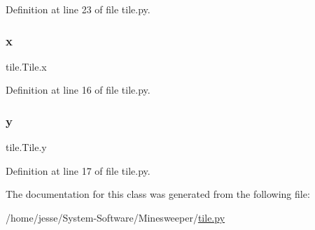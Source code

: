 Definition at line 23 of file tile.\+py.

\mbox{\label{classtile_1_1_tile_a3d5f111dcaf01ba902df52f85ee50318}} 
\subsubsection{\texorpdfstring{x}{x}}
{\footnotesize\ttfamily tile.\+Tile.\+x}



Definition at line 16 of file tile.\+py.

\mbox{\label{classtile_1_1_tile_aea02ac6a7bbed9aacf20d5db108f3006}} 
\subsubsection{\texorpdfstring{y}{y}}
{\footnotesize\ttfamily tile.\+Tile.\+y}



Definition at line 17 of file tile.\+py.



The documentation for this class was generated from the following file\+:\begin{DoxyCompactItemize}
\item 
/home/jesse/\+System-\/\+Software/\+Minesweeper/\mbox{\hyperlink{tile_8py}{tile.\+py}}\end{DoxyCompactItemize}
